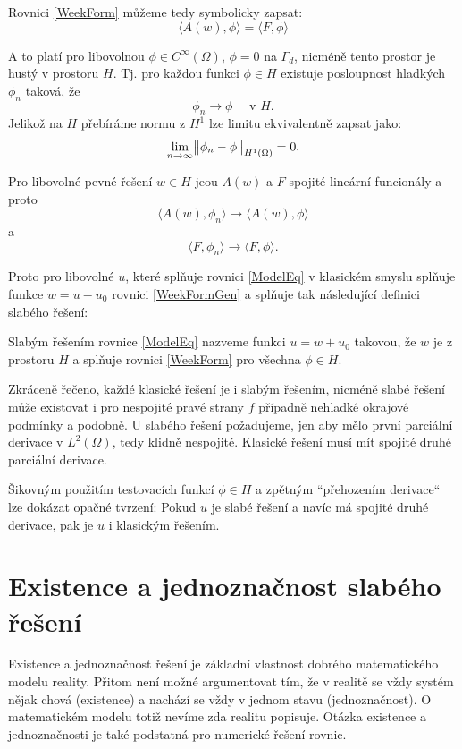 Rovnici \eqref{WeekForm} můžeme tedy symbolicky zapsat:
\begin{equation}
    \label{WeakFormGen}
    \langle A(w), \phi \rangle = \langle F, \phi \rangle 
\end{equation}
 
A to platí pro libovolnou $\phi \in C^\infty(\Omega)$, $\phi = 0$ na $\Gamma_d$,
nicméně tento prostor je hustý v prostoru $H$.
Tj. pro každou funkci $\phi\in H$ existuje posloupnost hladkých $\phi_n$ taková, že 
\[
  \phi_n \to \phi \quad \text{ v }H.
\]
Jelikož na $H$ přebíráme normu z $H^1$ lze limitu ekvivalentně zapsat jako:
\[
   \lim_{n\rightarrow\infty}\bigl\Vert\phi_n - \phi\bigr\Vert_{H^1(\Omega)}=0. 
\]

Pro libovolné pevné řešení $w\in H$ jeou $A(w)$ a $F$ spojité lineární funcionály a proto
\[
  \langle A(w), \phi_n\rangle \to \langle A(w), \phi \rangle
\]
a 
\[
  \langle F, \phi_n\rangle \to \langle F, \phi \rangle.
\]

Proto pro libovolné $u$, které splňuje rovnici \eqref{ModelEq} v klasickém smyslu splňuje funkce $w=u - u_0$ 
rovnici  \eqref{WeekFormGen} a splňuje tak následující definici slabého řešení:

\begin{definition}
 Slabým řešením rovnice \eqref{ModelEq} nazveme funkci $u=w+u_0$ takovou, že $w$ je z prostoru $H$
 a splňuje rovnici \eqref{WeekForm} pro všechna $\phi \in H$.
\end{definition}

Zkráceně řečeno, každé klasické řešení je i slabým řešením, nicméně slabé řešení může existovat i pro nespojité pravé strany $f$ případně
nehladké okrajové podmínky a podobně. U slabého řešení požadujeme, jen aby mělo první parciální derivace v $L^2(\Omega)$, tedy klidně nespojité.
Klasické řešení musí mít spojité druhé parciální derivace. 

Šikovným použitím testovacích funkcí  $\phi\in H$ a zpětným ``přehozením derivace`` lze dokázat opačné tvrzení: Pokud $u$ je slabé řešení a navíc má spojité druhé derivace, pak 
je $u$ i klasickým řešením. 

\section{Existence a jednoznačnost slabého řešení}
Existence a jednoznačnost řešení je základní vlastnost dobrého matematického modelu reality. Přitom není možné argumentovat tím, že v realitě 
se vždy systém nějak chová (existence) a nachází se vždy v jednom stavu (jednoznačnost). O matematickém modelu totiž nevíme zda realitu popisuje. 
Otázka existence a jednoznačnosti je také podstatná pro numerické řešení rovnic. 

